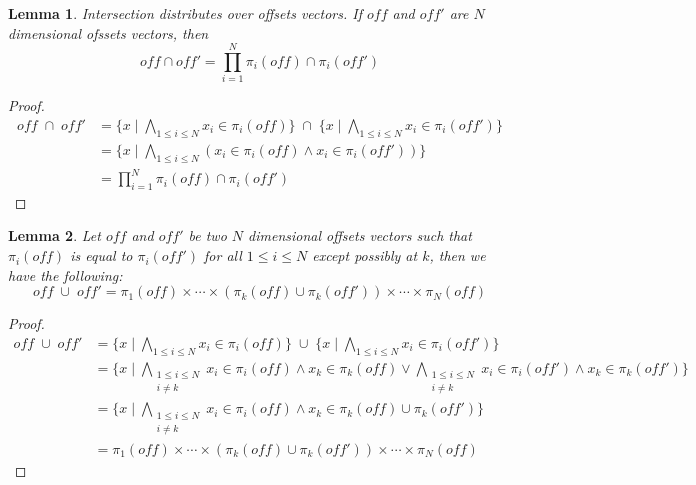 \documentclass[acmlarge,review]{acmart}
\theoremstyle{definition}
\theoremstyle{plain}
\newtheorem{lem}{Lemma}
\theoremstyle{remark}
\begin{document}
\begin{lem}{}\label{lem:vector-intersect}
  Intersection distributes over offsets vectors. If $\mathit{off}$ and
  $\mathit{off'}$ are $N$ dimensional ofssets vectors, then
%
  \begin{equation*}
    \mathit{off} \cap \mathit{off'} =
      \prod_{i = 1}^{N} \pi_i(\mathit{off}) \cap \pi_i(\mathit{off'})
  \end{equation*}
\end{lem}
%
\begin{proof}
  \begin{align*}
    \mathit{off} \; \cap \; \mathit{off'} &
    = \{x \mid \bigwedge_{1 \leq i \leq N } x_i \in \pi_i(\mathit{off}) \}
      \;\cap\;
      \{x \mid \bigwedge_{1 \leq i \leq N } x_i \in \pi_i(\mathit{off'}) \} \\
    & = \{x \mid \bigwedge_{1 \leq i \leq N }
      (x_i \in \pi_i(\mathit{off}) \wedge x_i \in \pi_i(\mathit{off'})) \} \\
    & = \prod_{i = 1}^{N} \pi_i(\mathit{off}) \cap \pi_i(\mathit{off'})
  \end{align*}
\end{proof}

\begin{lem}{}\label{lem:vector-union}
  Let $\mathit{off}$ and $\mathit{off'}$ be two $N$ dimensional offsets vectors
  such that $\pi_i(\mathit{off})$ is equal to $\pi_i(\mathit{off'})$ for all $1
  \leq i \leq N$ except possibly at $k$, then we have the following:
%
  \begin{equation*}
    \mathit{off} \; \cup \; \mathit{off'}
    =
    \pi_1(\mathit{off}) \times \cdots \times
    (\pi_k(\mathit{off}) \cup \pi_k(\mathit{off'})) \times \cdots \times
    \pi_N(\mathit{off})
  \end{equation*}
\end{lem}
%
\begin{proof}
  \begin{align*}
    \mathit{off} \; \cup \; \mathit{off'} &
    = \{x \mid
      \bigwedge_{1 \leq i \leq N } x_i \in \pi_i(\mathit{off}) \}
      \;\cup\;
      \{x \mid
          \bigwedge_{1 \leq i \leq N } x_i \in \pi_i(\mathit{off'}) \} \\
    & = \{x \mid
          \bigwedge_{\substack{1 \leq i \leq N \\ i \neq k}}
            x_i \in \pi_i(\mathit{off}) \wedge x_k \in \pi_k(\mathit{off}) \vee
          \bigwedge_{\substack{1 \leq i \leq N \\ i \neq k}} x_i \in
            \pi_i(\mathit{off'}) \wedge x_k \in \pi_k(\mathit{off'})
        \} \\
    & = \{x \mid
          \bigwedge_{\substack{1 \leq i \leq N \\ i \neq k}} x_i \in
            \pi_i(\mathit{off}) \wedge
            x_k \in \pi_k(\mathit{off}) \cup \pi_k(\mathit{off'})
        \} \\
        & = \pi_1(\mathit{off}) \times \cdots \times
        (\pi_k(\mathit{off}) \cup \pi_k(\mathit{off'})) \times \cdots \times
        \pi_N(\mathit{off})
  \end{align*}
\end{proof}
\end{document}
